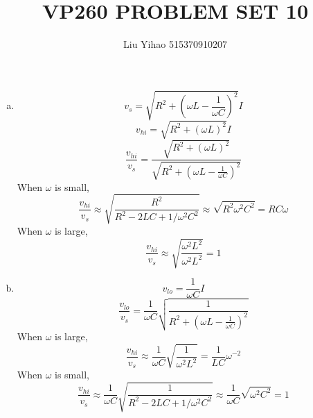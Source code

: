 \documentclass{article}
\title{VP260 PROBLEM SET 10}
\author{Liu Yihao 515370910207}
\date{}
\begin{document}
\maketitle

\section{}
\begin{enumerate}[(a)]
\item
$$v_s=\sqrt{R^2+\left(\omega L-\frac{1}{\omega C}\right)^2}I$$
$$v_{hi}=\sqrt{R^2+(\omega L)^2}I$$
$$\frac{v_{hi}}{v_s}=\frac{\sqrt{R^2+(\omega L)^2}}{\sqrt{R^2+\left(\omega L-\frac{1}{\omega C}\right)^2}}$$
When $\omega$ is small,
$$\frac{v_{hi}}{v_s}\approx\sqrt{\frac{R^2}{R^2-2LC+1/\omega^2C^2}}\approx\sqrt{R^2\omega^2C^2}=RC\omega$$
When $\omega$ is large,
$$\frac{v_{hi}}{v_s}\approx\sqrt{\frac{\omega^2L^2}{\omega^2L^2}}=1$$
\item
$$v_{lo}=\frac{1}{\omega C}I$$
$$\frac{v_{lo}}{v_s}=\frac{1}{\omega C}\sqrt{\frac{1}{R^2+\left(\omega L-\frac{1}{\omega C}\right)^2}}$$
When $\omega$ is large,
$$\frac{v_{hi}}{v_s}\approx\frac{1}{\omega C}\sqrt{\frac{1}{\omega^2L^2}}=\frac{1}{LC}\omega^{-2}$$
When $\omega$ is small,
 $$\frac{v_{hi}}{v_s}\approx\frac{1}{\omega C}\sqrt{\frac{1}{R^2-2LC+1/\omega^2C^2}}\approx\frac{1}{\omega C}\sqrt{\omega^2C^2}=1$$
\end{enumerate}
\end{document}
